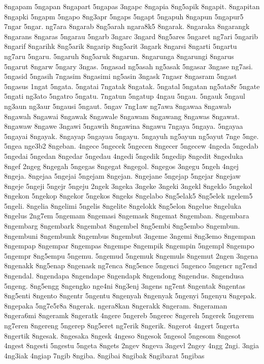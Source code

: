 {8ngapam 5ngapan 8ngapart 5ngapas 3ngapc 8ngapia 8ng5apik 8ngapit.
8ngapitan 8ngapki 5ngapm 5ngapo 8ng3apr 5ngaps 5ngapt 5ngapuh 8ngapun
5ngapur5 7ngar 5ngar. ng7ara 8ngarab 8ng5arah ngara8k5 8ngarak. 8ngaraka
8ngarangk 8ngarans 8ngaras 5ngarau 5ngarb 3ngarc 3ngard 8ng5ares 5ngaret
ng7ari 5ngarib 8ngarif 8ngarihk 8ng5arik 8ngarip 8ng5arit 3ngark 8ngarsi
8ngarti 5ngartu ng7aru 5ngaru. 5ngaruh 8ng5aruk 8ngarun. 8ngarunga
8ngarungi 8ngarus 5ngarut 8ngarw 5ngary 3ngas. 5ngasad ng5asah ng5asak
5ngasar 3ngase ng7asi. 5ngasid 5ngasih 7ngasim 8ngasimi ng5asin 3ngask
7ngasr 8ngasram 5ngast 5ngasus 1ngat 5ngata. 5ngatai 7ngatak 8ngatak.
5ngatal 5ngatan ng5ata8r 5ngate 5ngati ng3ato 5ngatro 5ngatu. 7ngatun
5ngatup 4ngau 5ngau. 5ngauk 5ngaul ng3aun ng3aur 5ngausi 5ngaut. 5ngav
7ng1aw ng7awa 8ngawaa 8ngawab 8ngawah 8ngawai 8ngawak 8ngawale 8ngawam
8ngawang 8ngawas 8ngawat. 8ngawaw 8ngawe 3ngawi 5ngawih 8ngawina 8ngawu
7ngaya 5ngaya. 5ngayaa 5ngayai 8ngayak. 8ngayap 5ngayau 5ngayu. 5ngayuh
ng5ayun ng5ayut 7nge 5nge. 5ngea nge3b2 8ngeban. 4ngece 5ngecek 5ngecen
8ngecer 5ngecew 4ngeda 5ngedab 5ngedai 5ngedan 8ngedar 5ngedau 4ngedi
5ngedik 5ngedip 8ngedit 8ngeduka 8ngef 2ngeg 8ngegah 5ngegas 8ngegat
8ngegol. 8ngegos 3ngegu 5ngeh 4ngej 8ngeja. 8ngejaa 5ngejai 5ngejam
8ngejan. 8ngejane 5ngejap 5ngejar 8ngejaw 8ngeje 5ngeji 5ngejr 5ngeju
2ngek 3ngeka 3ngeke 3ngeki 3ngekl 8ngeklo 5ngekol 8ngekon 5ngekop 8ngekor
5ngekos 8ngeks 8ngelabo 8ng5elak5 8ng5elek ngelem5 5ngeli. 8ngelia
8ngelimi 5ngelis 8ngelite 8ngelokk 8ng5elon 8ngelue 8ngeluka 8ngelus
2ng7em 5ngemam 8ngemasi 8ngemask 8ngemat 8ngemban. 8ngembara 8ngembarg
8ngembark 8ngembat 8ngembel 8ng5embi 8ng5embo 8ngembun. 8ngembuni
8ngembunk 8ngembus 8ngembut 3ngeme 3ngemi 8ng3emo 8ngempan 8ngempap
8ngempar 8ngempas 8ngempe 8ngempik 8ngempin 5ngempl 8ngempo 5ngempr
8ng5empu 5ngemu. 5ngemud 5ngemuk 8ngemuls 8ngemut 2ngen 3ngena 8ngenakk
8ng5enap 8ngenask ng7enca 8ng5ence 5ngenci 5ngenco 5ngencr ng7end
8ngendal. 8ngendapa 8ngendape 8ngendapk 8ngendong 8ngendus. 8ngendusa
5ngeng. 8ng5engg 8ngengko nge4ni 8ng3enj 3ngens ng7ent 8ngentak 8ngentas
8ng5enti 8ngento 8ngentr 5ngentu 8ngenyah 8ngenyak 5ngenyi 5ngenyu
8ngepak. 8ngepaka 5ng7e5r8a 8ngerak. ngera8kan 8ngerakk 8ngeram. 8ngeraman
8ngera6mi 8ngeramk 8ngeratk 4ngere 5ngereb 5ngerec 8ngereh 5ngerek 5ngerem
ng7eren 8ngereng 5ngerep 8ng5eret ng7erik 8ngerik. 8ngerot 4ngert 5ngerta
8ngertik 8ngesak. 8ngesaka 8ngesk 4ngeso 8ngesok 5ngesol 5ngesom 8ngesot
4ngest 8ngesti 5ngestu 5ngeta 8ngets 2ngev 8ngeva 3ngevl 2ngey 4ngg 2ngi.
3ngia 4ng3iak 4ngiap 7ngib 8ngiba. 8ngibai 8ngibak 8ngibarat 5ngibas
}
